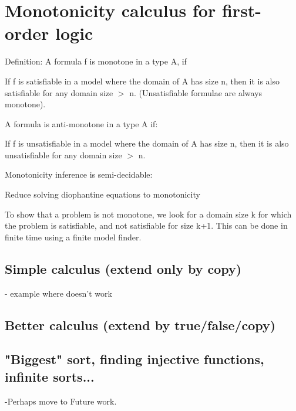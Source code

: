 \section{Monotonicity calculus for first-order logic}


Definition:
A formula f is monotone in a type A, if

  If f is satisfiable in a model where the domain of A has size n,
  then it is also satisfiable for any domain size $>$ n.
  (Unsatisfiable formulae are always monotone).

A formula is anti-monotone in a type A if:

  If f is unsatisfiable in a model where the domain of A has size n,
  then it is also unsatisfiable for any domain size $>$ n.

Monotonicity inference is semi-decidable:

Reduce solving diophantine equations to monotonicity

To show that a problem is not monotone, we look for a domain size
k for which the problem is satisfiable, and not satisfiable for size k+1.
This can be done in finite time using a finite model finder.



\subsection{Simple calculus (extend only by copy)}

- example where doesn't work

\subsection{Better calculus (extend by true/false/copy)}


\subsection{ "Biggest" sort, finding injective functions, infinite sorts...}

-Perhaps move to Future work.





















